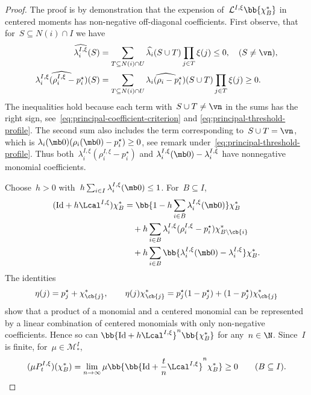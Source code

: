 \begin{proof}
The proof is by demonstration that the expension of~$\mathcal{L}^{I,\xi}\bb{\chi_B^*}$ in centered moments has non-negative off-diagonal coefficients.  First observe, that for~$S\subseteq N(i)\cap I$ we have
\begin{align*}
\widehat{\lambda_i^{I,\xi}}(S)
&=\sum_{T\subseteq N(i)\cap U}
 \widehat{\lambda_i}(S\cup T)\prod_{j\in T}\xi(j)
\leq0,
\quad(S\neq\vn),\\
\widehat{\lambda_i^{I,\xi}(\rho_i^{I,\xi}-p_i^\star)}(S)
&=\sum_{T\subseteq N(i)\cap U}
 \widehat{\lambda_i(\rho_i-p_i^\star)}(S\cup T)
 \prod_{j\in T}\xi(j)
\geq0.
\end{align*}
The inequalities hold because each term with~$S\cup T\neq \vn$ in  the sums has the right sign, see~\eqref{eq:principal-coefficient-criterion} and
\eqref{eq:principal-threshold-profile}. The second sum also includes the term corresponding to~$S\cup T = \vn$, which is
$\lambda_i(\mb0)(\rho_i(\mb0)-p_i^\star)\geq0$, see remark under~\eqref{eq:principal-threshold-profile}.
Thus both~$\lambda_i^{I,\xi}(\rho_i^{I,\xi}-p_i^\star)$ and
$\lambda_i^{I,\xi}(\mb0)-\lambda_i^{I,\xi}$ have nonnegative monomial
coefficients.

Choose~$h>0$ with~$h\sum_{i\in I}\lambda_i^{I,\xi}(\mb0)\leq1$.
For~$B\subseteq I$,
\begin{align*}
(\mathrm{Id}+h\Lcal^{I,\xi})\chi_B^*
&=\bb{1-h\sum_{i\in B}\lambda_i^{I,\xi}(\mb0)}\chi_B^*\\
&\quad+h\sum_{i\in B}
 \lambda_i^{I,\xi}(\rho_i^{I,\xi}-p_i^\star)
 \chi_{B\setminus\cb{i}}^*\\
&\quad+h\sum_{i\in B}
 \bb{\lambda_i^{I,\xi}(\mb0)-\lambda_i^{I,\xi}}\chi_B^*.
\end{align*}
The identities
\begin{equation*}
\eta(j)=p_j^\star+\chi_{\cb{j}}^*,
\qquad
\eta(j)\chi_{\cb{j}}^*
=p_j^\star(1-p_j^\star)+(1-p_j^\star)\chi_{\cb{j}}^*
\end{equation*}
show that a product of a monomial and a centered monomial can be represented by a linear combination of centered monomials with only non-negative coefficients. Hence so can
$\bb{\mathrm{Id}+h\Lcal^{I,\xi}}^n\bb{\chi_B^*}$ for any~$n\in\N$. Since~$I$ is finite, for~$\mu\in\mathcal M_*^I$,
\begin{equation*}
(\mu P_t^{I,\xi})(\chi_B^*)
=\lim_{n\to\infty}
 \mu\bb{\bb{\mathrm{Id}+\frac{t}{n}\Lcal^{I,\xi}}^n\chi_B^*}
\geq0
\qquad(B\subseteq I).
\end{equation*}
\end{proof}
\par
